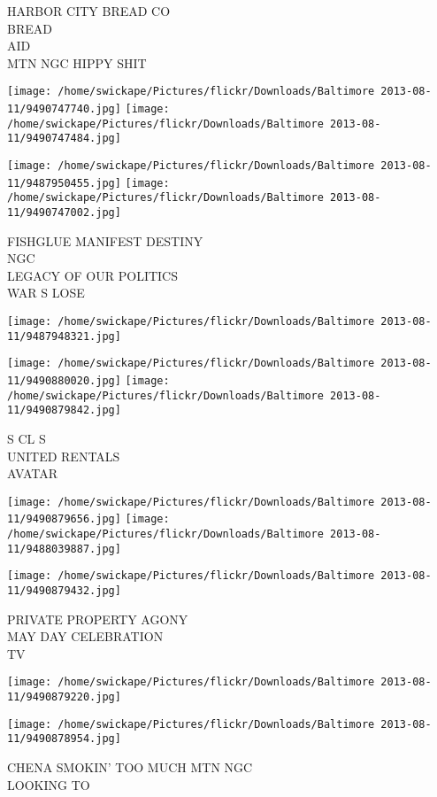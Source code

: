 \documentclass[10pt,letterpaper]{article}
\begin{document}
HARBOR CITY BREAD CO\\
BREAD\\
AID\\
MTN NGC HIPPY SHIT
\pagebreak

\texttt{[image: /home/swickape/Pictures/flickr/Downloads/Baltimore 2013-08-11/9490747740.jpg]}
\texttt{[image: /home/swickape/Pictures/flickr/Downloads/Baltimore 2013-08-11/9490747484.jpg]}

\texttt{[image: /home/swickape/Pictures/flickr/Downloads/Baltimore 2013-08-11/9487950455.jpg]}
\texttt{[image: /home/swickape/Pictures/flickr/Downloads/Baltimore 2013-08-11/9490747002.jpg]}

FISHGLUE MANIFEST DESTINY\\
NGC\\
LEGACY OF OUR POLITICS\\
WAR S LOSE
\pagebreak

\texttt{[image: /home/swickape/Pictures/flickr/Downloads/Baltimore 2013-08-11/9487948321.jpg]}

\vspace{0.25in}
\texttt{[image: /home/swickape/Pictures/flickr/Downloads/Baltimore 2013-08-11/9490880020.jpg]}
\texttt{[image: /home/swickape/Pictures/flickr/Downloads/Baltimore 2013-08-11/9490879842.jpg]}

S CL S\\
UNITED RENTALS\\
AVATAR
\pagebreak

\texttt{[image: /home/swickape/Pictures/flickr/Downloads/Baltimore 2013-08-11/9490879656.jpg]}
\texttt{[image: /home/swickape/Pictures/flickr/Downloads/Baltimore 2013-08-11/9488039887.jpg]}

\texttt{[image: /home/swickape/Pictures/flickr/Downloads/Baltimore 2013-08-11/9490879432.jpg]}

PRIVATE PROPERTY AGONY\\
MAY DAY CELEBRATION\\
TV
\pagebreak

\texttt{[image: /home/swickape/Pictures/flickr/Downloads/Baltimore 2013-08-11/9490879220.jpg]}

\vspace{0.25in}
\texttt{[image: /home/swickape/Pictures/flickr/Downloads/Baltimore 2013-08-11/9490878954.jpg]}

CHENA SMOKIN' TOO MUCH MTN NGC\\
LOOKING TO
\pagebreak
\end{document}
